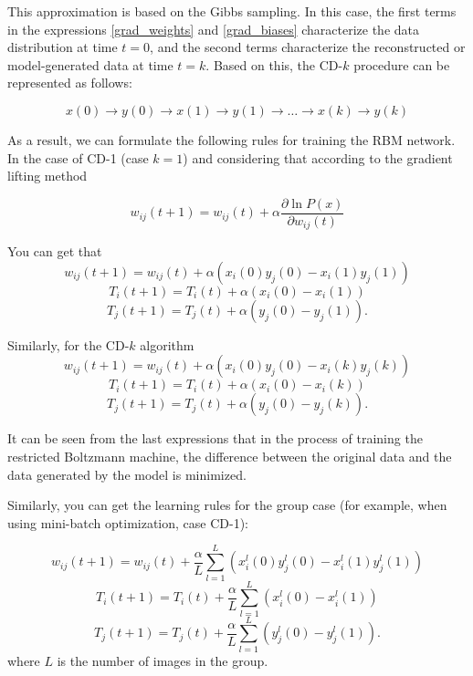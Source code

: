 This approximation is based on the Gibbs sampling. In this case, the first terms in the expressions \ref{grad_weights} and \ref{grad_biases} characterize the data distribution at time $t=0$, and the second terms characterize the reconstructed or model-generated data at time $t=k$. Based on this, the CD-$k$ procedure can be represented as follows:

\begin{equation}
x(0) \rightarrow y(0) \rightarrow x(1) \rightarrow y(1) \rightarrow \ldots \rightarrow x(k) \rightarrow y(k)
\end{equation}

As a result, we can formulate the following rules for training the RBM network. In the case of CD-1 (case $k=1$) and considering that according to the gradient lifting method

\begin{equation*}
w_{ij}(t+1)=w_{ij}(t)+\alpha\frac{\partial \ln P(x)}{\partial w_{ij}(t)}
\end{equation*}

You can get that
\begin{equation*}
w_{ij}(t+1)=w_{ij}(t)+\alpha(x_i(0)y_j(0)-x_i(1)y_j(1))
\end{equation*}
\begin{equation*}
T_i(t+1)=T_i(t)+\alpha(x_i(0)-x_i(1))
\end{equation*}
\begin{equation*}
T_j(t+1)=T_j(t)+\alpha(y_j(0)-y_j(1)).
\end{equation*}

Similarly, for the CD-$k$ algorithm
\begin{equation*}
w_{ij}(t+1)=w_{ij}(t)+\alpha(x_i(0)y_j(0)-x_i(k)y_j(k))
\end{equation*}
\begin{equation*}
T_i(t+1)=T_i(t)+\alpha(x_i(0)-x_i(k))
\end{equation*}
\begin{equation*}
T_j(t+1)=T_j(t)+\alpha(y_j(0)-y_j(k)).
\end{equation*}

It can be seen from the last expressions that in the process of training the restricted Boltzmann machine, the difference between the original data and the data generated by the model is minimized.

Similarly, you can get the learning rules for the group case (for example, when using mini-batch optimization, case CD-1):

\begin{equation*}
w_{ij}(t+1)=w_{ij}(t)+\frac{\alpha}{L}\sum_{l=1}^L(x_i^l(0)y_j^l(0)-x_i^l(1)y_j^l(1))
\end{equation*}
\begin{equation*}
T_i(t+1)=T_i(t)+\frac{\alpha}{L}\sum_{l=1}^L(x_i^l(0)-x_i^l(1))
\end{equation*}
\begin{equation*}
T_j(t+1)=T_j(t)+\frac{\alpha}{L}\sum_{l=1}^L(y_j^l(0)-y_j^l(1)).
\end{equation*}
where $L$ is the number of images in the group.

